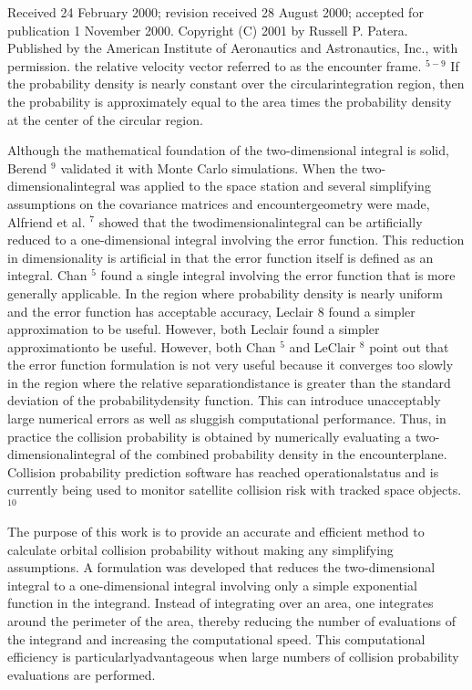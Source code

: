 \documentclass[10pt]{article}
\begin{document}
Received 24 February 2000; revision received 28 August 2000; accepted for publication 1 November 2000. Copyright (C) 2001 by Russell P. Patera. Published by the American Institute of Aeronautics and Astronautics, Inc., with permission. the relative velocity vector referred to as the encounter frame. ${ }^{5-9}$ If the probability density is nearly constant over the circularintegration region, then the probability is approximately equal to the area times the probability density at the center of the circular region.

Although the mathematical foundation of the two-dimensional integral is solid, Berend ${ }^{9}$ validated it with Monte Carlo simulations. When the two-dimensionalintegral was applied to the space station and several simplifying assumptions on the covariance matrices and encountergeometry were made, Alfriend et al. ${ }^{7}$ showed that the twodimensionalintegral can be artificially reduced to a one-dimensional integral involving the error function. This reduction in dimensionality is artificial in that the error function itself is defined as an integral. Chan ${ }^{5}$ found a single integral involving the error function that is more generally applicable. In the region where probability density is nearly uniform and the error function has acceptable accuracy, Leclair 8 found a simpler approximation to be useful. However, both Leclair found a simpler approximationto be useful. However, both Chan ${ }^{5}$ and LeClair ${ }^{8}$ point out that the error function formulation is not very useful because it converges too slowly in the region where the relative separationdistance is greater than the standard deviation of the probabilitydensity function. This can introduce unacceptably large numerical errors as well as sluggish computational performance. Thus, in practice the collision probability is obtained by numerically evaluating a two-dimensionalintegral of the combined probability density in the encounterplane. Collision probability prediction software has reached operationalstatus and is currently being used to monitor satellite collision risk with tracked space objects. ${ }^{10}$

The purpose of this work is to provide an accurate and efficient method to calculate orbital collision probability without making any simplifying assumptions. A formulation was developed that reduces the two-dimensional integral to a one-dimensional integral involving only a simple exponential function in the integrand. Instead of integrating over an area, one integrates around the perimeter of the area, thereby reducing the number of evaluations of the integrand and increasing the computational speed. This computational efficiency is particularlyadvantageous when large numbers of collision probability evaluations are performed.
\end{document}
